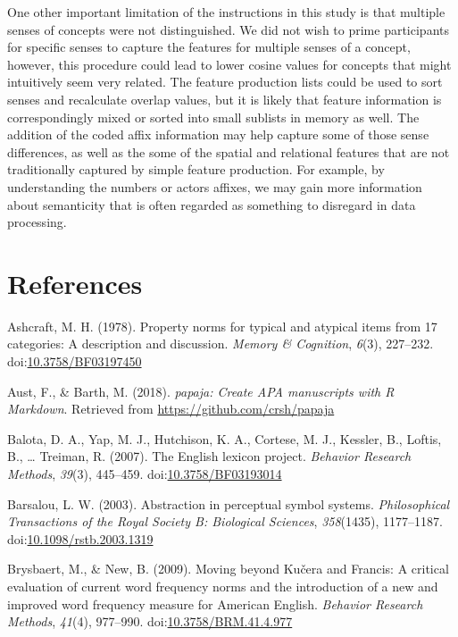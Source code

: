 \documentclass[english,man]{apa6}
\theoremstyle{definition}
\theoremstyle{definition}
\theoremstyle{definition}
\theoremstyle{remark}
\begin{document}
One other important limitation of the instructions in this study is that
multiple senses of concepts were not distinguished. We did not wish to
prime participants for specific senses to capture the features for
multiple senses of a concept, however, this procedure could lead to
lower cosine values for concepts that might intuitively seem very
related. The feature production lists could be used to sort senses and
recalculate overlap values, but it is likely that feature information is
correspondingly mixed or sorted into small sublists in memory as well.
The addition of the coded affix information may help capture some of
those sense differences, as well as the some of the spatial and
relational features that are not traditionally captured by simple
feature production. For example, by understanding the numbers or actors
affixes, we may gain more information about semanticity that is often
regarded as something to disregard in data processing.

\newpage

\section{References}\label{references}

\setlength{\parindent}{-0.5in} \setlength{\leftskip}{0.5in}

\hypertarget{refs}{}
\hypertarget{ref-Ashcraft1978a}{}
Ashcraft, M. H. (1978). Property norms for typical and atypical items
from 17 categories: A description and discussion. \emph{Memory \&
Cognition}, \emph{6}(3), 227--232.
doi:\href{https://doi.org/10.3758/BF03197450}{10.3758/BF03197450}

\hypertarget{ref-R-papaja}{}
Aust, F., \& Barth, M. (2018). \emph{papaja: Create APA manuscripts with
R Markdown}. Retrieved from \url{https://github.com/crsh/papaja}

\hypertarget{ref-Balota2007}{}
Balota, D. A., Yap, M. J., Hutchison, K. A., Cortese, M. J., Kessler,
B., Loftis, B., \ldots{} Treiman, R. (2007). The English lexicon
project. \emph{Behavior Research Methods}, \emph{39}(3), 445--459.
doi:\href{https://doi.org/10.3758/BF03193014}{10.3758/BF03193014}

\hypertarget{ref-Barsalou2003}{}
Barsalou, L. W. (2003). Abstraction in perceptual symbol systems.
\emph{Philosophical Transactions of the Royal Society B: Biological
Sciences}, \emph{358}(1435), 1177--1187.
doi:\href{https://doi.org/10.1098/rstb.2003.1319}{10.1098/rstb.2003.1319}

\hypertarget{ref-Brysbaert2009}{}
Brysbaert, M., \& New, B. (2009). Moving beyond Kučera and Francis: A
critical evaluation of current word frequency norms and the introduction
of a new and improved word frequency measure for American English.
\emph{Behavior Research Methods}, \emph{41}(4), 977--990.
doi:\href{https://doi.org/10.3758/BRM.41.4.977}{10.3758/BRM.41.4.977}
\end{document}
